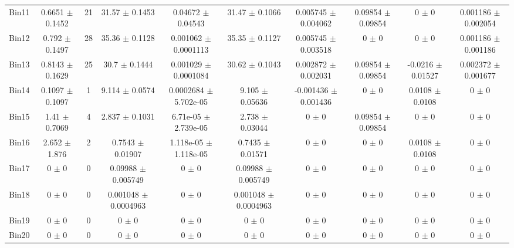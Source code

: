 \begin{tabular}{@{\extracolsep{4pt}}lccccccccc@{}}
     Bin11 & 0.6651 $\pm$ 0.1452 & 21 & 31.57 $\pm$ 0.1453 & 0.04672 $\pm$ 0.04543 & 31.47 $\pm$ 0.1066 & 0.005745 $\pm$ 0.004062 & 0.09854 $\pm$ 0.09854 & 0 $\pm$ 0 & 0.001186 $\pm$ 0.002054 \\ 
     Bin12 & 0.792 $\pm$ 0.1497 & 28 & 35.36 $\pm$ 0.1128 & 0.001062 $\pm$ 0.0001113 & 35.35 $\pm$ 0.1127 & 0.005745 $\pm$ 0.003518 & 0 $\pm$ 0 & 0 $\pm$ 0 & 0.001186 $\pm$ 0.001186 \\ 
     Bin13 & 0.8143 $\pm$ 0.1629 & 25 & 30.7 $\pm$ 0.1444 & 0.001029 $\pm$ 0.0001084 & 30.62 $\pm$ 0.1043 & 0.002872 $\pm$ 0.002031 & 0.09854 $\pm$ 0.09854 & -0.0216 $\pm$ 0.01527 & 0.002372 $\pm$ 0.001677 \\ 
     Bin14 & 0.1097 $\pm$ 0.1097 & 1 & 9.114 $\pm$ 0.0574 & 0.0002684 $\pm$ 5.702e-05 & 9.105 $\pm$ 0.05636 & -0.001436 $\pm$ 0.001436 & 0 $\pm$ 0 & 0.0108 $\pm$ 0.0108 & 0 $\pm$ 0 \\ 
     Bin15 & 1.41 $\pm$ 0.7069 & 4 & 2.837 $\pm$ 0.1031 & 6.71e-05 $\pm$ 2.739e-05 & 2.738 $\pm$ 0.03044 & 0 $\pm$ 0 & 0.09854 $\pm$ 0.09854 & 0 $\pm$ 0 & 0 $\pm$ 0 \\ 
     Bin16 & 2.652 $\pm$ 1.876 & 2 & 0.7543 $\pm$ 0.01907 & 1.118e-05 $\pm$ 1.118e-05 & 0.7435 $\pm$ 0.01571 & 0 $\pm$ 0 & 0 $\pm$ 0 & 0.0108 $\pm$ 0.0108 & 0 $\pm$ 0 \\ 
     Bin17 & 0 $\pm$ 0 & 0 & 0.09988 $\pm$ 0.005749 & 0 $\pm$ 0 & 0.09988 $\pm$ 0.005749 & 0 $\pm$ 0 & 0 $\pm$ 0 & 0 $\pm$ 0 & 0 $\pm$ 0 \\ 
     Bin18 & 0 $\pm$ 0 & 0 & 0.001048 $\pm$ 0.0004963 & 0 $\pm$ 0 & 0.001048 $\pm$ 0.0004963 & 0 $\pm$ 0 & 0 $\pm$ 0 & 0 $\pm$ 0 & 0 $\pm$ 0 \\ 
     Bin19 & 0 $\pm$ 0 & 0 & 0 $\pm$ 0 & 0 $\pm$ 0 & 0 $\pm$ 0 & 0 $\pm$ 0 & 0 $\pm$ 0 & 0 $\pm$ 0 & 0 $\pm$ 0 \\ 
     Bin20 & 0 $\pm$ 0 & 0 & 0 $\pm$ 0 & 0 $\pm$ 0 & 0 $\pm$ 0 & 0 $\pm$ 0 & 0 $\pm$ 0 & 0 $\pm$ 0 & 0 $\pm$ 0 \\ 
\hline\hline
  \end{tabular}

